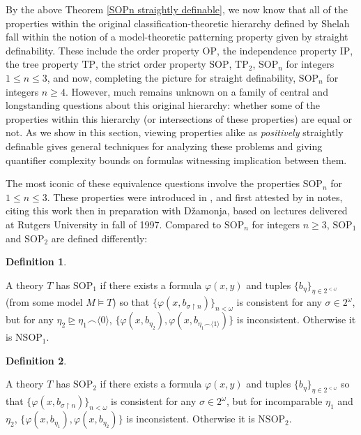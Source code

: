 \documentclass{article}
\theoremstyle{definition}
\newtheorem{definition}{Definition}
\theoremstyle{definition}
\theoremstyle{definition}
\begin{document}
By the above Theorem \ref{SOPn straightly definable}, we now know that all of the properties within the original classification-theoretic hierarchy defined by Shelah fall within the notion of a model-theoretic patterning property given by straight definability. These include the order property $\mathrm{OP}$, the independence property $\mathrm{IP}$, the tree property $\mathrm{TP}$, the strict order property $\mathrm{SOP}$, $\mathrm{TP}_{2}$, $\mathrm{SOP}_{n}$ for integers $1 \leq n \leq 3$, and now, completing the picture for straight definability, $\mathrm{SOP}_{n}$ for integers $n \geq 4$. However, much remains unknown on a family of central and longstanding questions about this original hierarchy: whether some of the properties within this hierarchy (or intersections of these properties) are equal or not. As we show in this section, viewing properties alike as \textit{positively} straightly definable gives general techniques for analyzing these problems and giving quantifier complexity bounds on formulas witnessing implication between them.

The most iconic of these equivalence questions involve the properties $\mathrm{SOP}_{n}$ for $1 \leq n \leq 3$. These properties were introduced in \cite{Dzamonja2004}, and first attested by \cite{shelah_what_2000} in notes, citing this work then in preparation with Džamonja, based on lectures delivered at Rutgers University in fall of 1997. Compared to $\mathrm{SOP}_{n}$ for integers $n \geq 3$, $\mathrm{SOP}_{1}$ and $\mathrm{SOP}_{2}$ are defined differently:

\begin{definition}
\label{1-strict order property}


A theory $T$ has $\mathrm{SOP}_{1}$ if there exists a formula $\varphi(x, y)$ and tuples $\{b_{\eta}\}_{\eta \in 2^{<\omega}}$ (from some model $M \models T$) so that $\{\varphi(x, b_{\sigma \upharpoonright n})\}_{n < \omega}$ is consistent for any $\sigma \in 2^{\omega}$, but for any $\eta_{2} \unrhd \eta_{1} \smallfrown \langle 0\rangle$, $\{\varphi(x, b_{\eta_{2}}), \varphi(x, b_{\eta_{1} \smallfrown \langle 1\rangle})\}$ is inconsistent. Otherwise it is $\mathrm{NSOP}_{1}$.
\end{definition}

\begin{definition}
\label{2-strict order property}

A theory $T$ has $\mathrm{SOP}_{2}$ if there exists a formula $\varphi(x, y)$ and tuples $\{b_{\eta}\}_{\eta \in 2^{<\omega}}$ so that $\{\varphi(x, b_{\sigma \upharpoonright n})\}_{n < \omega}$ is consistent for any $\sigma \in 2^{\omega}$, but for incomparable $\eta_{1}$ and $\eta_{2}$, $\{\varphi(x, b_{\eta_{1}}), \varphi(x, b_{\eta_{2}})\}$ is inconsistent. Otherwise it is $\mathrm{NSOP}_{2}$.
\end{definition}
\end{document}
